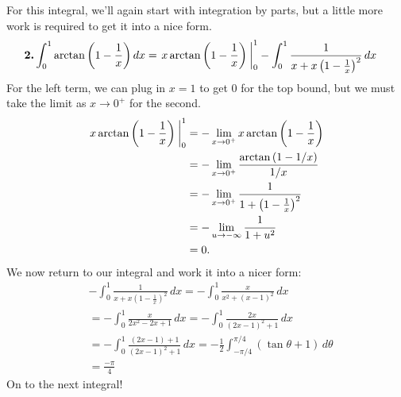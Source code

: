For this integral,  we'll again start with integration by parts, but a little more work is
required to get it into a nice form.
\begin{align*}
    \textbf{2.} \int_{ 0 }^{ 1 } \arctan{\left( 1 - \frac{1}{x} \right)} \, dx &= \bounds{x \arctan{\left( 1 - \frac{1}{x} \right)}}{0}{1} - \int_{ 0 }^{ 1 } \frac{1}{x + x\left( 1 - \frac{1}{x} \right)^2} \, dx
\end{align*}
For the left term, we can plug in \( x = 1 \) to get \( 0 \) for the top bound, but we must take the limit as \( x \to 0^+ \) for the second.
\begin{align*}
    \bounds{x \arctan{\left( 1 - \frac{1}{x} \right)}}{0}{1} &= - \lim_{x \to 0^+} x \arctan{\left( 1 - \frac{1}{x} \right)} \\
    &= - \lim_{x \to 0^+} \frac{\arctan{\left( 1 - 1/x \right)}}{1 / x} \\
    &= - \lim_{x \to 0^+} \frac{1}{1 + \left( 1 - \frac{1}{x} \right)^2} \\
    &= - \lim_{u \to -\infty} \frac{1}{1 + u^2} \\
    &= 0
.\end{align*}
We now return to our integral and work it into a nicer form:
\begin{align*}
    &- \int_{ 0 }^{ 1 } \frac{1}{x + x \left( 1 - \frac{1}{x} \right)^2} \, dx = - \int_{ 0 }^{ 1 } \frac{x}{x^2 + \left( x - 1 \right)^2} \, dx \\
    &= - \int_{ 0 }^{ 1 } \frac{x}{2x^2 - 2x + 1} \, dx = - \int_{ 0 }^{ 1 } \frac{2x}{\left( 2x - 1 \right)^2 + 1} \, dx \\
    &= - \int_{ 0 }^{ 1 } \frac{\left( 2x - 1 \right) + 1}{\left( 2x - 1 \right)^2 + 1} \, dx = -\frac{1}{2} \int_{ -\pi/4 }^{ \pi/4 } \left( \tan{\theta} + 1 \right) \, d\theta \\
    &= \boxed{\frac{-\pi}{4}}
\end{align*}
On to the next integral!

